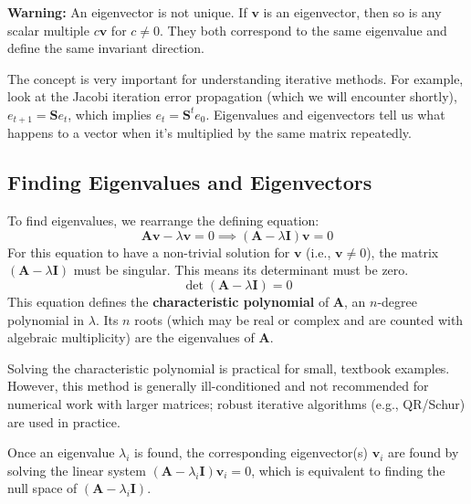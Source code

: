 \begin{warningBox}
    \textbf{Warning:} An eigenvector is not unique. If $\mathbf{v}$ is an eigenvector, then so is any scalar multiple $c\mathbf{v}$ for $c \neq 0$. They both correspond to the same eigenvalue and define the same invariant direction.
\end{warningBox}

The concept is very important for understanding iterative methods. For example, look at the Jacobi iteration error propagation (which we will encounter shortly), $e_{t+1} = \mathbf{S}e_t$, which implies $e_t = \mathbf{S}^t e_0$. Eigenvalues and eigenvectors tell us what happens to a vector when it's multiplied by the same matrix repeatedly.

\subsection{Finding Eigenvalues and Eigenvectors}

To find eigenvalues, we rearrange the defining equation:
$$ \mathbf{A}\mathbf{v} - \lambda \mathbf{v} = 0 \implies (\mathbf{A} - \lambda \mathbf{I})\mathbf{v} = 0 $$
For this equation to have a non-trivial solution for $\mathbf{v}$ (i.e., $\mathbf{v} \neq 0$), the matrix $(\mathbf{A} - \lambda \mathbf{I})$ must be singular. This means its determinant must be zero.
$$ \det(\mathbf{A} - \lambda \mathbf{I}) = 0 $$
This equation defines the \textbf{characteristic polynomial} of $\mathbf{A}$, an $n$-degree polynomial in $\lambda$. Its $n$ roots (which may be real or complex and are counted with algebraic multiplicity) are the eigenvalues of $\mathbf{A}$.

Solving the characteristic polynomial is practical for small, textbook examples. However, this method is generally ill-conditioned and not recommended for numerical work with larger matrices; robust iterative algorithms (e.g., QR/Schur) are used in practice.

Once an eigenvalue $\lambda_i$ is found, the corresponding eigenvector(s) $\mathbf{v}_i$ are found by solving the linear system $(\mathbf{A} - \lambda_i \mathbf{I})\mathbf{v}_i = 0$, which is equivalent to finding the null space of $(\mathbf{A} - \lambda_i \mathbf{I})$.

